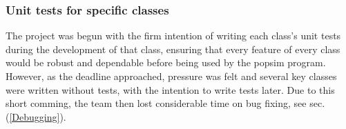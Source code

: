 \subsubsection{Unit tests for specific classes}
The project was begun with the firm intention of writing each class's unit tests during the development of that class, ensuring that every feature of every class would be robust and dependable before being used by the popsim program.  However, as the deadline approached, pressure was felt and several key classes were written without tests, with the intention to write tests later.
Due to this short comming, the team then lost considerable time on bug fixing, see sec.(\ref{Debugging}).
%

